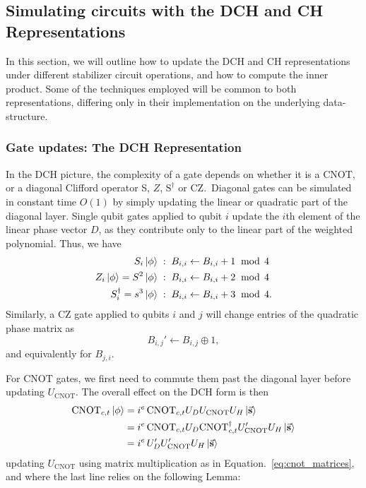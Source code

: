 \subsection{Simulating circuits with the DCH and CH Representations}\label{sec:dch_ch_methods}
In this section, we will outline how to update the DCH and CH representations under different stabilizer circuit operations, and how to compute the inner product. Some of the techniques employed will be common to both representations, differing only in their implementation on the underlying data-structure.
\subsubsection{Gate updates: The DCH Representation}
In the DCH picture, the complexity of a gate depends on whether it is a CNOT, or a diagonal Clifford operator S, $Z$, $\text{S}^{\dagger}$ or CZ.\ Diagonal gates can be simulated in constant time $O(1)$ by simply updating the linear or quadratic part of the diagonal layer. Single qubit gates applied to qubit $i$ update the $i$th element of the linear phase vector $D$, as they contribute only to the linear part of the weighted polynomial. Thus, we have
\begin{align}
S_{i}\ket{\phi} &\;:\;B_{i,i}\leftarrow B_{i,i} + 1\;\bmod\,4 \\
Z_{i}\ket{\phi} = S^{2}\ket{\phi} &\;:\;B_{i,i}\leftarrow B_{i,i} +2\;\bmod\,4 \\
S_{i}^{\dagger} = s^{3}\ket{\phi} & \;:\;B_{i,i}\leftarrow B_{i,i} + 3\;\bmod\,4. 
\end{align}
Similarly, a CZ gate applied to qubits $i$ and $j$ will change entries of the quadratic phase matrix as
\begin{equation}
B_{i,j}' \leftarrow B_{i,j}\oplus 1,
\end{equation}
and equivalently for $B_{j,i}$.\par
For CNOT gates, we first need to commute them past the diagonal layer before updating $U_{\text{CNOT}}$. The overall effect on the DCH form is then
\begin{align}
\text{CNOT}_{c,t}\ket{\phi} &= i^{e}\,\text{CNOT}_{c,t}U_{D}U_{\text{CNOT}}U_{H} \ket{\va{s}}\nonumber \\
&= i^{e}\,\text{CNOT}_{c,t}U_{D}\text{CNOT}_{c,t}^{\dagger} U_{\text{CNOT}}' U_{H}\ket{\va{s}} \nonumber \\
&= i^{e}\,U_{D}'U_{\text{CNOT}}'U_{H}\ket{\va{s}}
\end{align}
updating $U_{\text{CNOT}}$ using matrix multiplication as in Equation.~\ref{eq:cnot_matrices}, and where the last line relies on the following Lemma:
